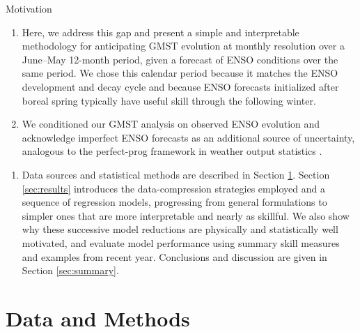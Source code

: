 \documentclass[aspectratio=169,xcolor=dvipsnames]{beamer}
\begin{document}
\begin{frame}{Motivation}
  \begin{enumerate}\tiny
  \item Here, we address this gap and present a simple and
    interpretable methodology for anticipating GMST evolution at
    monthly resolution over a June--May 12-month period, given a
    forecast of ENSO conditions over the same period.  We chose this
    calendar period because it matches the ENSO development and decay
    cycle and because ENSO forecasts initialized after boreal spring
    typically have useful skill through the following winter.

  \item We conditioned our GMST analysis on observed ENSO evolution and
    acknowledge imperfect ENSO forecasts as an additional source of
    uncertainty, analogous to the perfect-prog framework in weather
    output statistics \citep{Glahn72,Klein1959objective}.
  \end{enumerate}

  \begin{enumerate}\tiny
  \item Data sources and statistical methods are described in Section
    \ref{sec:data-methods}.  Section \ref{sec:results} introduces the
    data-compression strategies employed and a sequence of regression
    models, progressing from general formulations to simpler ones that
    are more interpretable and nearly as skillful. We also show why
    these successive model reductions are physically and statistically
    well motivated, and evaluate model performance using summary skill
    measures and examples from recent year. Conclusions and discussion
    are given in Section \ref{sec:summary}.
  \end{enumerate}
\end{frame}



\section{Data and Methods}\label{sec:data-methods}
\end{document}
